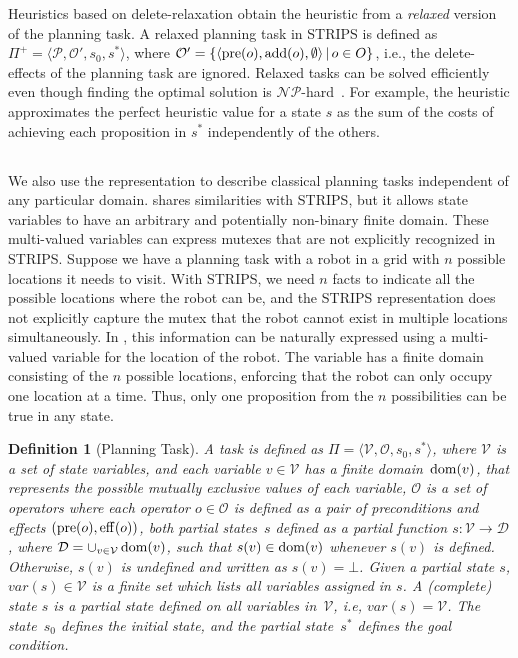 \documentclass[ppgc,diss,english]{iiufrgs}
\newtheorem{definition}{Definition}
\begin{document}
Heuristics based on delete-relaxation obtain the heuristic from a \emph{relaxed} version of the planning task. A relaxed planning task in STRIPS is defined as $\Pi^{+}=\langle\mathcal{P},\mathcal{O'},s_{0},s^{*}\rangle$, where $\mathcal{O'} = \{ \langle \operatorname{pre}(o), \operatorname{add}(o), \emptyset \rangle \,|\, o \in O \}$, i.e., the delete-effects of the planning task are ignored. Relaxed tasks can be solved efficiently even though finding the optimal solution is $\mathcal{NP}$-hard~\cite{Bylander/1994}. For example, the heuristic \hadd approximates the perfect heuristic value for a state $s$ as the sum of the costs of achieving each proposition in $s^{*}$ independently of the others.

\subsection{\sas}
\label{sec:background-sas}
We also use the \sas representation to describe classical planning tasks independent of any particular domain. \sas shares similarities with STRIPS, but it allows state variables to have an arbitrary and potentially non-binary finite domain. These multi-valued variables can express mutexes that are not explicitly recognized in STRIPS. Suppose we have a planning task with a robot in a grid with $n$ possible locations it needs to visit. With STRIPS, we need $n$ facts to indicate all the possible locations where the robot can be, and the STRIPS representation does not explicitly capture the mutex that the robot cannot exist in multiple locations simultaneously. In \sas, this information can be naturally expressed using a multi-valued variable for the location of the robot. The variable has a finite domain consisting of the $n$ possible locations, enforcing that the robot can only occupy one location at a time. Thus, only one proposition from the $n$ possibilities can be true in any state.

\begin{definition}[\sas Planning Task]\label{def:sas}
A \sas task is defined as $\Pi=\langle\mathcal{V},\mathcal{O},s_0,s^*\rangle$, where $\mathcal{V}$ is a set of state variables, and each variable $v\in \mathcal{V}$ has a finite domain~$\operatorname{dom}(v)$, that represents the possible mutually exclusive values of each variable, $\mathcal{O}$ is a set of operators where each operator $o \in \mathcal{O}$ is defined as a pair of preconditions and effects $(\operatorname{pre}(o),\operatorname{eff}(o))$, both partial states~$s$ defined as a partial function $s:\mathcal{V}\rightarrow \mathcal{D}$, where $\mathcal{D}=\cup_{v\in \mathcal{V}}\operatorname{dom}(v)$, such that $s(v)\in \operatorname{dom}(v)$ whenever $s(v)$ is defined. Otherwise, $s(v)$ is undefined and written as $s(v)=\bot$. Given a partial state $s$, $var(s) \in \mathcal{V}$ is a finite set which lists all variables assigned in $s$. A (complete) state $s$ is a partial state defined on all variables in~$\mathcal{V}$, i.e, $var(s) = \mathcal{V}$. The state~$s_0$ defines the initial state, and the partial state~$s^*$ defines the goal condition.
\end{definition}
\end{document}
